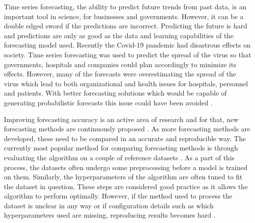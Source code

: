 
\ifpdf
    \graphicspath{{1_introduction/figures/PNG/}{1_introduction/figures/PDF/}{1_introduction/figures/}}
\else
    \graphicspath{{1_introduction/figures/EPS/}{1_introduction/figures/}}
\fi



Time series forecasting, the ability to predict future trends from past data, is an important tool in science, for businesses and governments. However, it can be a double edged sword if the predictions are incorrect. Predicting the future is hard and predictions are only as good as the data and learning capabilities of the forecasting model used. Recently the Covid-19 pandemic had disastrous effects on society. Time series forecasting was used to predict the spread of the virus so that governments, hospitals and companies could plan accordingly to minimize its effects. However, many of the forecasts were overestimating the spread of the virus which lead to both organizational and health issues for hospitals, personnel and patients. With better forecasting solutions which would be capable of generating probabilistic forecasts this issue could have been avoided \cite{IOANNIDIS2020}.

Improving forecasting accuracy is an active area of research and for that, new forecasting methods are continuously proposed \cite{salinas_deepar_2019,rangapuram_deep_2018,oord_wavenet_2016,oreshkin_n-beats_2020,salinas_high-dimensional_2019}. As more forecasting methods are developed, these need to be compared in an accurate and reproducible way. The currently most popular method for comparing forecasting methods is through evaluating the algorithm on a couple of reference datasets \cite{hyndman_forecasting_3rd}. As a part of this process, the datasets often undergo some preprocessing before a model is trained on them. Similarly, the hyperparameters of the algorithm are often tuned to fit the dataset in question. These steps are considered good practice as it allows the algorithm to perform optimally. However, if the method used to process the dataset is unclear in any way or if configuration details such as which hyperparameters used are missing, reproducing results becomes hard \cite{makridakis_m4_2020}. 


